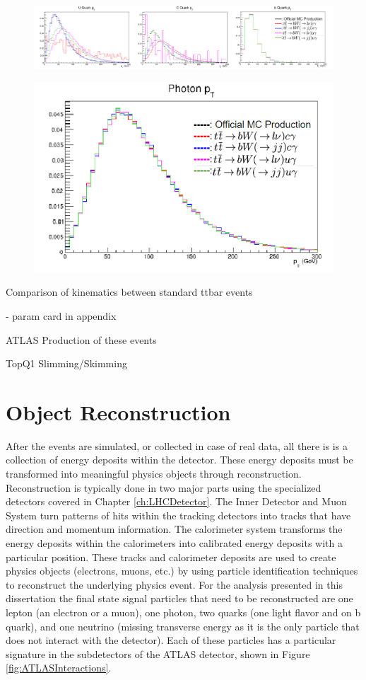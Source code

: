 \begin{figure}[h!]
	\centering
	\includegraphics[width=\columnwidth]{../ThesisImages/FCNCValidation/quarks.png}
	\caption{
	}
\end{figure}

\begin{figure}[h!]
	\centering
	\includegraphics[width=.5\columnwidth]{../ThesisImages/FCNCValidation/photon.png}
	\caption{
	}
\end{figure}


Comparison of kinematics between standard ttbar events

- param card in appendix

ATLAS Production of these events

TopQ1 Slimming/Skimming


\section{Object Reconstruction}

After the events are simulated, or collected in case of real data, all there is is a collection of energy deposits within the detector.  These energy deposits must be transformed into meaningful physics objects through reconstruction.  Reconstruction is typically done in two major parts using the specialized detectors covered in Chapter \ref{ch:LHCDetector}.  The Inner Detector and Muon System turn patterns of hits within the tracking detectors into tracks that have direction and momentum information.  The calorimeter system transforms the energy deposits within the calorimeters into calibrated energy deposits with a particular position.  These tracks and calorimeter deposits are used to create physics objects (electrons, muons, etc.) by using particle identification techniques to reconstruct the underlying physics event.  For the analysis presented in this dissertation the final state signal particles that need to be reconstructed are one lepton (an electron or a muon), one photon, two quarks (one light flavor and on b quark), and one neutrino (missing transverse energy as it is the only particle that does not interact with the detector).  Each of these particles has a particular signature in the subdetectors of the ATLAS detector, shown in Figure \ref{fig:ATLASInteractions}.


